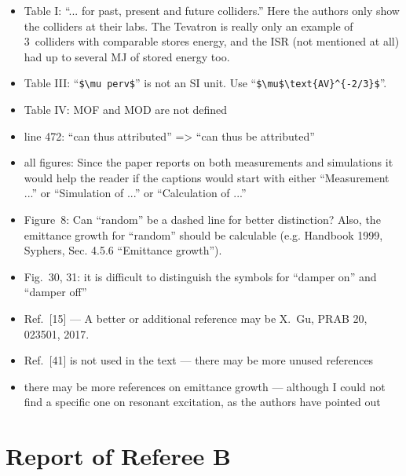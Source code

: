 \documentclass[aps
,prstab
,preprint,tightenlines
,amsfonts,amssymb,amsmath
]{revtex4-1}
\begin{document}
{\begin{itemize}

\item Table I: ``... for past, present and future colliders.'' Here the 
authors only show the colliders at their labs. The Tevatron is really 
only an example of 3~colliders with comparable stores energy, and the 
ISR (not mentioned at all) had up to several MJ of stored energy too. 

\item Table III: ``\verb!$\mu perv$!'' is not an SI unit. Use 
``\verb!$\mu$\text{AV}^{-2/3}$!''. 

\item Table IV: MOF and MOD are not defined 

\item line 472: ``can thus attributed'' => ``can thus be attributed'' 

\item all figures: Since the paper reports on both measurements and 
simulations it would help the reader if the captions would start with 
either ``Measurement ...'' or ``Simulation of ...'' or ``Calculation of 
...'' 

\item Figure~8: Can ``random'' be a dashed line for better distinction? 
Also, the emittance growth for ``random'' should be calculable (e.g. 
Handbook 1999, Syphers, Sec. 4.5.6 ``Emittance growth''). 

\item Fig.~30, 31: it is difficult to distinguish the symbols for ``damper 
on'' and ``damper off'' 

\item Ref.~[15] --- A better or additional reference may be X.~Gu, PRAB 20, 
023501, 2017. 

\item Ref.~[41] is not used in the text --- there may be more unused 
references 

\item there may be more references on emittance growth --- although I could 
not find a specific one on resonant excitation, as the authors have 
pointed out

\end{itemize}
}


\section*{Report of Referee B}
\end{document}
